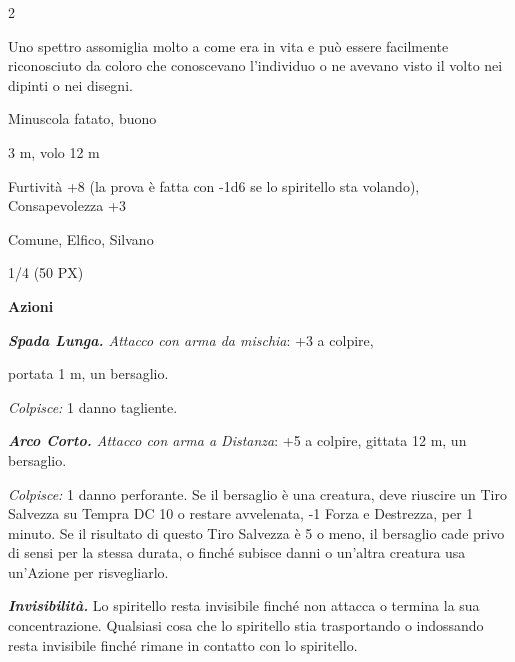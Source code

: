 \begin{multicols}{2}
{Uno spettro assomiglia molto a come era in vita e può essere facilmente riconosciuto da coloro che conoscevano l’individuo o ne avevano visto il volto nei dipinti o nei disegni.

\begin{description}[noitemsep, topsep=0pt, parsep=0pt, partopsep=0pt, itemsep=1pt, leftmargin=2.35cm,  labelwidth=2.2cm, itemindent=0cm, listparindent=0pt] %
\setlength{\baselineskip}{10pt}
\item[\textbf{Taglia/Tipo}] Minuscola fatato, buono
\item[\textbf{Caratt.}] 
\item[\textbf{Punti Ferita}] 
\item[\textbf{Movimento}] 3 m, volo 12 m
\item[\textbf{Tiri Salvez.}] 
\item[\textbf{Comp.}] Furtività +8 (la prova è fatta con -1d6 se lo spiritello sta volando), Consapevolezza +3
\item[\textbf{Linguaggi}] Comune, Elfico, Silvano
\item[\textbf{Sfida}] 1/4 (50 PX)
\end{description}
\smallskip

\textbf{Azioni}

\emph{\textbf{Spada Lunga.} Attacco con arma da mischia}: +3 a colpire,

portata 1 m, un bersaglio.

\emph{Colpisce:} 1 danno tagliente.

\emph{\textbf{Arco Corto.} Attacco con arma a Distanza}: +5 a colpire, gittata 12 m, un bersaglio.

\emph{Colpisce:} 1 danno perforante. Se il bersaglio è una creatura, deve riuscire un Tiro Salvezza su Tempra DC 10 o restare avvelenata, -1 Forza e Destrezza, per 1 minuto. Se il risultato di questo Tiro Salvezza è 5 o meno, il bersaglio cade privo di sensi per la stessa durata, o finché subisce danni o un'altra creatura usa un'Azione per risvegliarlo.

\emph{\textbf{Invisibilità.}} Lo spiritello resta invisibile finché non attacca o termina la sua concentrazione. Qualsiasi cosa che lo spiritello stia trasportando o indossando resta invisibile finché rimane in contatto con lo spiritello.

}
\end{multicols}
